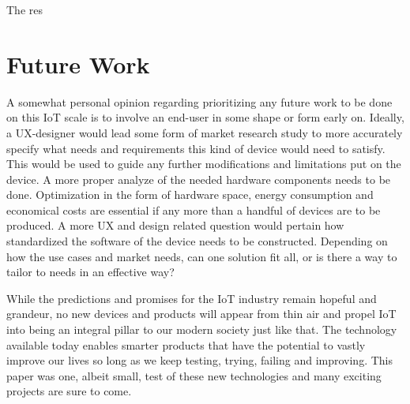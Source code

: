 \iffalse
\begin{itemize}
	\item Critique
	\item Discussion
	\item Do not make the reader do all the work
\end{itemize}
\fi
The res

\section{Future Work}
A somewhat personal opinion regarding prioritizing any future work to be done on this IoT scale is to involve an end-user in some shape or form early on. Ideally, a UX-designer would lead some form of market research study to more accurately specify what needs and requirements this kind of device would need to satisfy. This would be used to guide any further modifications and limitations put on the device.
A more proper analyze of the needed hardware components needs to be done. Optimization in the form of hardware space, energy consumption and economical costs are essential if any more than a handful of devices are to be produced.
A more UX and design related question would pertain how standardized the software of the device needs to be constructed. Depending on how the use cases and market needs, can one solution fit all, or is there a way to tailor to needs in an effective way?


While the predictions and promises for the IoT industry remain hopeful and grandeur, no new devices and products will appear from thin air and propel IoT into being an integral pillar to our modern society just like that. The technology available today enables smarter products that have the potential to vastly improve our lives so long as we keep testing, trying, failing and improving. This paper was one, albeit small, test of these new technologies and many exciting projects are sure to come.